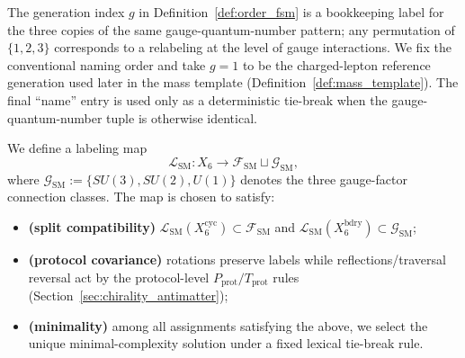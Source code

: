 \begin{remark}\label{rem:order_fsm_generation}
The generation index $g$ in Definition~\ref{def:order_fsm} is a bookkeeping label for the three copies of the same gauge-quantum-number pattern; any permutation of $\{1,2,3\}$ corresponds to a relabeling at the level of gauge interactions.
We fix the conventional naming order and take $g=1$ to be the charged-lepton reference generation used later in the mass template (Definition~\ref{def:mass_template}).
The final ``name'' entry is used only as a deterministic tie-break when the gauge-quantum-number tuple is otherwise identical.
\end{remark}

We define a labeling map
\[
\mathcal{L}_{\mathrm{SM}}:X_6\to \mathcal{F}_{\mathrm{SM}}\sqcup \mathcal{G}_{\mathrm{SM}},
\]
where $\mathcal{G}_{\mathrm{SM}}:=\{SU(3),SU(2),U(1)\}$ denotes the three gauge-factor connection classes.
The map is chosen to satisfy:
\begin{itemize}
\item \textbf{(split compatibility)} $\mathcal{L}_{\mathrm{SM}}(X_6^{\mathrm{cyc}})\subset \mathcal{F}_{\mathrm{SM}}$ and $\mathcal{L}_{\mathrm{SM}}(X_6^{\mathrm{bdry}})\subset \mathcal{G}_{\mathrm{SM}}$;
\item \textbf{(protocol covariance)} rotations preserve labels while reflections/traversal reversal act by the protocol-level $P_{\mathrm{prot}}/T_{\mathrm{prot}}$ rules (Section~\ref{sec:chirality_antimatter});
\item \textbf{(minimality)} among all assignments satisfying the above, we select the unique minimal-complexity solution under a fixed lexical tie-break rule.
\end{itemize}


